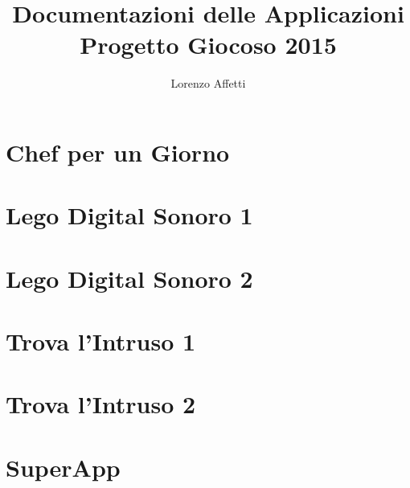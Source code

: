\documentclass[12pt,a4paper,twoside,openright]{report}
\begin{document}
\title{%
    Documentazioni delle Applicazioni \\
    Progetto Giocoso 2015}
\author{Lorenzo Affetti}

\maketitle

\tableofcontents
{}
\setcounter{page}{1}

\chapter{Chef per un Giorno}


\chapter{Lego Digital Sonoro 1}


\chapter{Lego Digital Sonoro 2}


\chapter{Trova l'Intruso 1}


\chapter{Trova l'Intruso 2}


\chapter{SuperApp}

\end{document}
